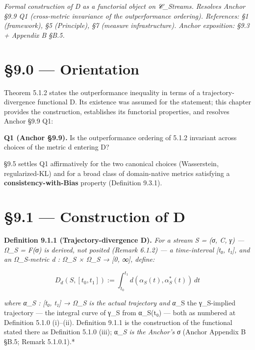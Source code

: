 \documentclass[11pt, openany]{book}
\renewenvironment{quote}{\begin{quoting}}{\end{quoting}}
\newcommand{\sectionbreak}{\clearpage}
\begin{document}
\textit{Formal construction of D as a functorial object on 𝒞\_\allowbreak{}Streams. Resolves Anchor §9.9 Q1 (cross-metric invariance of the outperformance ordering). References: §1 (framework), §5 (Principle), §7 (measure infrastructure). Anchor exposition: §9.3 + Appendix B §B.5.}

\sectionbreak

\section{§9.0 --- Orientation}

Theorem 5.1.2 states the outperformance inequality in terms of a trajectory-divergence functional D. Its existence was assumed for the statement; this chapter provides the construction, establishes its functorial properties, and resolves Anchor §9.9 Q1:

\begin{quote}
\textbf{Q1 (Anchor §9.9).} Is the outperformance ordering of 5.1.2 invariant across choices of the metric d entering D?
\end{quote}

§9.5 settles Q1 affirmatively for the two canonical choices (Wasserstein, regularized-KL) and for a broad class of domain-native metrics satisfying a \textbf{consistency-with-Bias} property (Definition 9.3.1).

\sectionbreak

\section{§9.1 --- Construction of D}

\textbf{Definition 9.1.1 (Trajectory-divergence D).} \textit{For a stream S = (σ, C, γ) --- Ω\_\allowbreak{}S = F(σ) is derived, not posited (Remark 6.1.2) --- a time-interval [t₀, t₁], and an Ω\_\allowbreak{}S-metric d : Ω\_\allowbreak{}S × Ω\_\allowbreak{}S → [0, ∞], define:}

\[
D_d(S, [t_0, t_1]) := \int_{t_0}^{t_1} d(\alpha_S(t), \alpha^*_S(t)) \, dt
\]

\textit{where α\_\allowbreak{}S : [t₀, t₁] → Ω\_\allowbreak{}S is the actual trajectory and α}\_\allowbreak{}S the γ\_\allowbreak{}S-implied trajectory --- the integral curve of γ\_\allowbreak{}S from α\_\allowbreak{}S(t₀) --- both as numbered at Definition 5.1.0 (i)–(ii). Definition 9.1.1 is the construction of the functional stated there as Definition 5.1.0 (iii); α\textit{\_\allowbreak{}S is the Anchor's σ} (Anchor Appendix B §B.5; Remark 5.1.0.1).*
\end{document}
